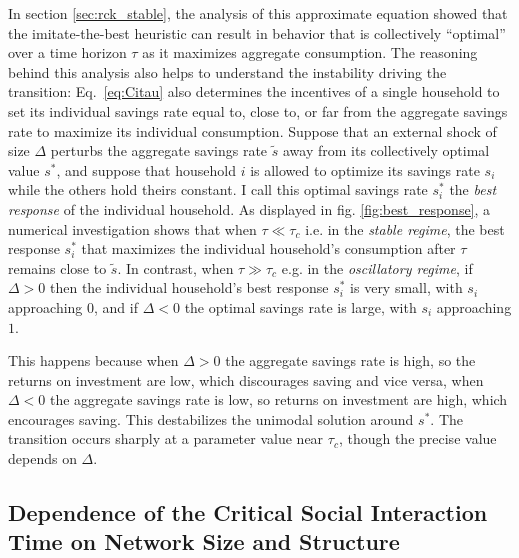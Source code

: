 In section \ref{sec:rck_stable}, the analysis of this approximate equation showed that the imitate-the-best heuristic can result in behavior that is collectively ``optimal'' over a time horizon $\tau$ as it maximizes aggregate consumption. 
The reasoning behind this analysis also helps to understand the instability driving the transition: Eq.~\eqref{eq:Citau} also determines the incentives of a single household to set its individual savings rate equal to, close to, or far from the aggregate savings rate to maximize its individual consumption. 
Suppose that an external shock of size $\Delta$ perturbs the aggregate savings rate $\tilde{s}$ away from its collectively optimal value $s^\ast$, and suppose that household $i$ is allowed to optimize its savings rate $s_i$ while the others hold theirs constant. 
I call this optimal savings rate $s^*_i$ the \emph{best response} of the individual household. 
As displayed in fig. \ref{fig:best_response}, a numerical investigation shows that when $\tau \ll \tau_{c}$ i.e. in the \emph{stable regime}, the best response $s^*_i$ that maximizes the individual household's consumption after $\tau$ remains close to $\tilde{s}$. 
In contrast, when  $\tau \gg \tau_{c}$ e.g. in the \emph{oscillatory regime}, if $\Delta > 0$ then the individual household's best response $s^*_i$ is very small, with $s_i$ approaching $0$, and if $\Delta < 0$ the optimal savings rate is large, with $s_i$ approaching $1$. 


This happens because when $\Delta > 0$ the aggregate savings rate is high, so the returns on investment are low, which discourages saving and vice versa, when $\Delta < 0$ the aggregate savings rate is low, so returns on investment are high, which encourages saving. 
This destabilizes the unimodal solution around $s^\ast$. 
The transition occurs sharply at a parameter value near $\tau_{c}$, though the precise value depends on $\Delta$.
\newpage
\subsection{Dependence of the Critical Social Interaction Time on Network Size and Structure}  
\label{sec:savings_network_structure}

